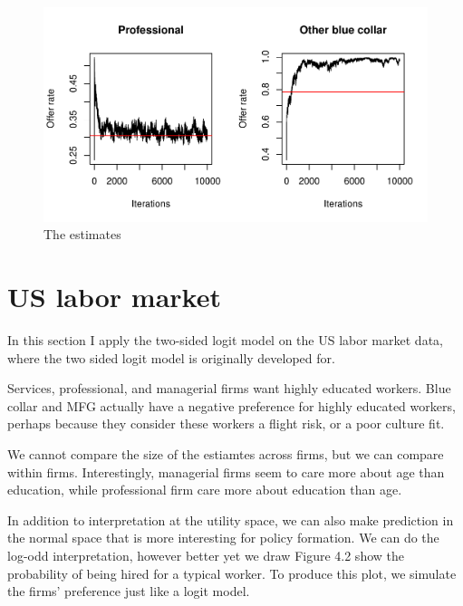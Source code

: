 \begin{figure}[tbp]
  \centering
  \includegraphics[width=\textwidth,keepaspectratio]{../figure/sim_labor_nojobs_nounemp_offer_rate}
  \caption[Estimates for the preference of a desirable and an undesirable firm.]{The estimates }
  \label{fig:sim_labor_nojobs_nounemp_offer_rate}
\end{figure}

\section{US labor market}
\label{sec:labor}

In this section I apply the two-sided logit model on the US labor market data, where the two sided logit model is originally developed for.

Services, professional, and managerial firms want highly educated workers. Blue
collar and MFG actually have a negative preference for highly educated workers,
perhaps because they consider these workers a flight risk, or a poor culture
fit.

We cannot compare the size of the estiamtes across firms, but we can compare
within firms. Interestingly, managerial firms seem to care more about age than
education, while professional firm care more about education than age.

In addition to interpretation at the utility space, we can also make prediction
in the normal space that is more interesting for policy formation. We can do the
log-odd interpretation, however better yet we draw Figure 4.2
show the probability of being hired for a typical worker. To produce this plot,
we simulate the firms' preference just like a logit model.

